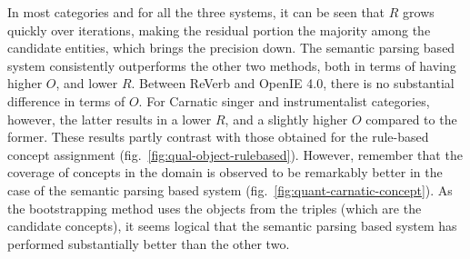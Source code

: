 \documentclass{llncs}
\begin{document}

In most categories and for all the three systems, it can be seen that $R$ grows quickly over iterations, making the residual portion the majority among the candidate entities, which brings the precision down. The semantic parsing based system consistently outperforms the other two methods, both in terms of having higher $O$, and lower $R$. Between ReVerb and OpenIE 4.0, there is no substantial difference in terms of $O$. For Carnatic singer and instrumentalist categories, however, the latter results in a lower $R$, and a slightly higher $O$ compared to the former. These results partly contrast with those obtained for the rule-based concept assignment (fig.~\ref{fig:qual-object-rulebased}). However, remember that the coverage of concepts in the domain is observed to be remarkably better in the case of the semantic parsing based system 
(fig.~\ref{fig:quant-carnatic-concept}). As the bootstrapping method uses the objects from the triples (which are the candidate concepts), it seems logical that the semantic parsing based system has performed substantially better than the other two.
\end{document}

